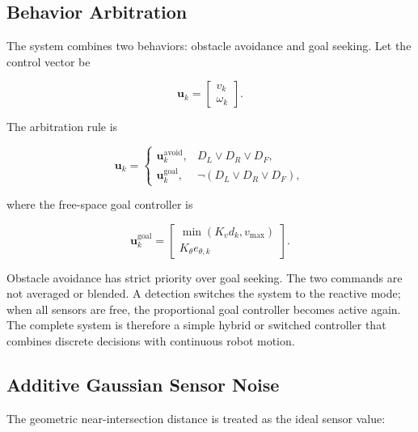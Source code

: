 \documentclass[10pt,twocolumn,a4paper]{article}
\begin{document}
\subsection{Behavior Arbitration}

The system combines two behaviors: obstacle avoidance and goal seeking.
Let the control vector be

\begin{equation}
    \mathbf{u}_k=
    \begin{bmatrix}
        v_k\\
        \omega_k
    \end{bmatrix}.
    \label{eq:control_vector}
\end{equation}

The arbitration rule is

\begin{equation}
    \mathbf{u}_k=
    \begin{cases}
        \mathbf{u}^{\mathrm{avoid}}_k,
        & D_L\lor D_R\lor D_F,\\[1mm]
        \mathbf{u}^{\mathrm{goal}}_k,
        & \neg(D_L\lor D_R\lor D_F),
    \end{cases}
    \label{eq:behavior_arbitration}
\end{equation}

where the free-space goal controller is

\begin{equation}
    \mathbf{u}^{\mathrm{goal}}_k
    =
    \begin{bmatrix}
        \min(K_vd_k,v_{\max})\\
        K_{\theta}e_{\theta,k}
    \end{bmatrix}.
    \label{eq:goal_control_vector}
\end{equation}

Obstacle avoidance has strict priority over goal seeking. The two
commands are not averaged or blended. A detection switches the system
to the reactive mode; when all sensors are free, the proportional goal
controller becomes active again. The complete system is therefore a
simple hybrid or switched controller that combines discrete decisions
with continuous robot motion.

\subsection{Additive Gaussian Sensor Noise}

The geometric near-intersection distance is treated as the ideal sensor
value:
\end{document}

